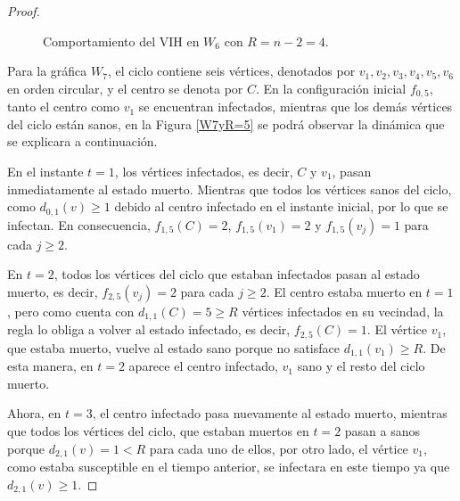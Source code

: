 \documentclass[12pt,titlepage,twoside,openright]{book}
\begin{document}
\begin{proof}
\begin{figure}[h]
    \caption{Comportamiento del VIH en $W_6$ con $R=n-2=4$.}
    \label{W6yR=4}
    \end{figure}
    
    Para la gr\'afica $W_7$, el ciclo contiene seis v\'ertices, denotados por $v_1,v_2,v_3,v_4,v_5,v_6$ en orden circular, y el centro se denota por $C$. En la configuraci\'on inicial $f_{0,5}$, tanto el centro como $v_1$ se encuentran infectados, mientras que los dem\'as v\'ertices del ciclo est\'an sanos, en la Figura \ref{W7yR=5} se podr\'a observar la din\'amica que se explicara a continuaci\'on.

    En el instante $t=1$, los v\'ertices infectados, es decir, $C$ y $v_1$, pasan inmediatamente al estado muerto. Mientras que todos los v\'ertices sanos del ciclo, como $d_{0,1}(v)\geq1$ debido al centro infectado en el instante inicial, por lo que se infectan. En consecuencia, $f_{1,5}(C)=2$, $f_{1,5}(v_1)=2$ y $f_{1,5}(v_j)=1$ para cada $j\ge 2$.

    En $t=2$, todos los v\'ertices del ciclo que estaban infectados pasan al estado muerto, es decir, $f_{2,5}(v_j)=2$ para cada $j\ge 2$. El centro estaba muerto en $t=1$, pero como cuenta con $d_{1,1}(C)=5\geq R$ v\'ertices infectados en su vecindad, la regla lo obliga a volver al estado infectado, es decir, $f_{2,5}(C)=1$. El v\'ertice $v_1$, que estaba muerto, vuelve al estado sano porque no satisface $d_{1,1}(v_1)\ge R$. De esta manera, en $t=2$ aparece el centro infectado, $v_1$ sano y el resto del ciclo muerto.

    Ahora, en $t=3$, el centro infectado pasa nuevamente al estado muerto, mientras que todos los v\'ertices del ciclo, que estaban muertos en $t=2$ pasan a sanos porque $d_{2,1}(v)= 1<R$ para cada uno de ellos, por otro lado, el v\'ertice $v_1$, como estaba susceptible en el tiempo anterior, se infectara en este tiempo ya que $d_{2,1}(v)\geq1$.


\end{proof}
\end{document}

